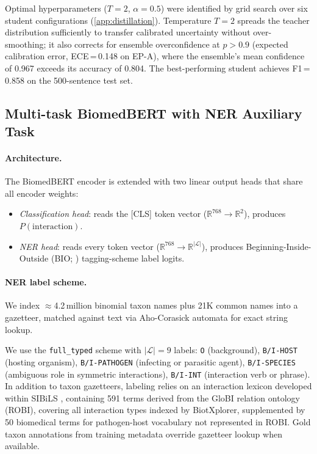 \documentclass[a4paper,fleqn]{cas-sc}
\begin{document}
Optimal hyperparameters ($T{=}2$, $\alpha{=}0.5$) were identified by
grid search over six student configurations (\ref{app:distillation}).
Temperature $T{=}2$ spreads the teacher distribution sufficiently to
transfer calibrated uncertainty without over-smoothing; it also corrects
for ensemble overconfidence at $p{>}0.9$ (expected calibration error,
ECE\,=\,0.148 on EP-A),
where the ensemble's mean confidence of 0.967 exceeds its accuracy of 0.804. The best-performing
student achieves F1\,=\,0.858 on the 500-sentence test set.

\subsection{Multi-task BiomedBERT with NER Auxiliary Task}
\label{sec:multitask}

\paragraph{Architecture.}
The BiomedBERT encoder is extended with two linear output heads that share
all encoder weights:
\begin{itemize}
    \item \textit{Classification head}: reads the [CLS] token vector
    ($\mathbb{R}^{768} \to \mathbb{R}^2$), produces $P(\text{interaction})$.
    \item \textit{NER head}: reads every token vector
    ($\mathbb{R}^{768} \to \mathbb{R}^{|\mathcal{L}|}$), produces
    Beginning-Inside-Outside (BIO; \citep{ramshaw1995text}) tagging-scheme
    label logits.
\end{itemize}

\paragraph{NER label scheme.}
We index $\approx$4.2\,million binomial taxon names plus 21K common
names into a gazetteer, matched against text via Aho-Corasick automata
\citep{aho1975efficient} for exact string lookup.

We use the \texttt{full\_typed} scheme with $|\mathcal{L}| = 9$ labels:
\texttt{O} (background), \texttt{B/I-HOST} (hosting organism),
\texttt{B/I-PATHOGEN} (infecting or parasitic agent),
\texttt{B/I-SPECIES} (ambiguous role in symmetric interactions),
\texttt{B/I-INT} (interaction verb or phrase).
In addition to taxon gazetteers, labeling relies on an interaction lexicon
developed within SIBiLS \citep{mottin2021sibils}, containing 591 terms derived
from the GloBI relation ontology (ROBI), covering all interaction types indexed
by BiotXplorer, supplemented by 50 biomedical terms for pathogen-host vocabulary
not represented in ROBI.
Gold taxon annotations from training metadata override gazetteer lookup when
available.
\end{document}
